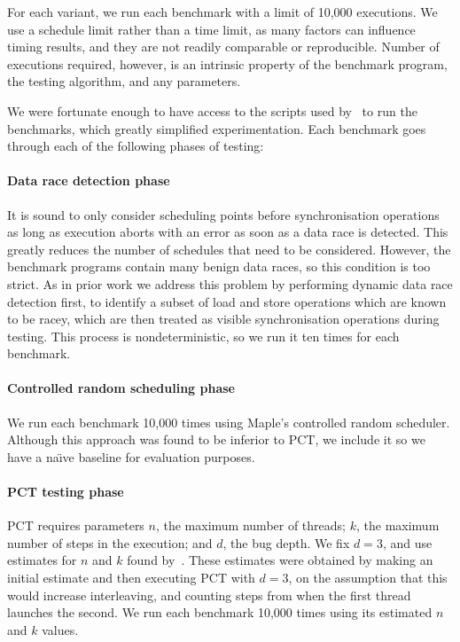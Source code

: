 For each variant, we run each benchmark with a limit of 10,000
executions.  We use a schedule limit rather than a time limit, as many
factors can influence timing results, and they are not readily
comparable or reproducible.  Number of executions required, however,
is an intrinsic property of the benchmark program, the testing
algorithm, and any parameters.

We were fortunate enough to have access to the scripts used
by~\cite{thomson2016,thomson2014} to run the benchmarks, which greatly
simplified experimentation.  Each benchmark goes through each of the
following phases of testing:

\paragraph{Data race detection phase}
It is sound to only consider scheduling points before synchronisation operations
as long as execution aborts with an error as soon as a data race is
detected\cite{musuvathi2008}.  This greatly reduces the number of schedules that
need to be considered.  However, the benchmark programs contain many benign data
races\cite{thomson2016}, so this condition is too strict.  As in prior
work\cite{thomson2016,thomson2014,yu2012} we address this problem by performing
dynamic data race detection first, to identify a subset of load and store
operations which are known to be racey, which are then treated as visible
synchronisation operations during testing.  This process is nondeterministic, so
we run it ten times for each benchmark.

\paragraph{Controlled random scheduling phase}
We run each benchmark 10,000 times using Maple's controlled random scheduler.  Although
this approach was found to be inferior to PCT\cite{thomson2016}, we include it
so we have a na\"{\i}ve baseline for evaluation purposes.

\paragraph{PCT testing phase}
PCT requires parameters $n$, the maximum number of threads; $k$, the maximum
number of steps in the execution; and $d$, the bug depth.  We fix $d=3$, and use
estimates for $n$ and $k$ found by~\cite{thomson2016}.  These estimates were
obtained by making an initial estimate and then executing PCT with $d=3$, on the
assumption that this would increase interleaving, and counting steps from when
the first thread launches the second.  We run each benchmark 10,000 times using
its estimated $n$ and $k$ values.


